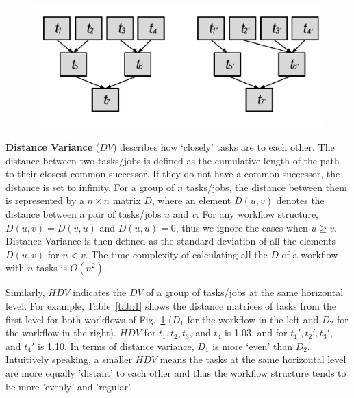 \documentclass[final]{IEEEtran}
\begin{document}
\begin{figure}[htb]
	\centering
	\includegraphics[width=0.85\linewidth]{figure/hifv.pdf}
	\label{fig:hifv}
	\vspace{-10pt}
\end{figure}

\textbf{Distance Variance} ($DV$) describes how `closely' tasks are to each other. The distance between two tasks/jobs is defined as the cumulative length of the path to their closest common successor. If they do not have a common successor, the distance is set to infinity. For a group of $n$ tasks/jobs, the distance between them is represented by a $n \times n$ matrix $D$, where an element $D(u,v)$ denotes the distance between a pair of tasks/jobs $u$ and $v$. For any workflow structure, $D(u,v)=D(v,u)$ and $D(u,u)=0$, thus we ignore the cases when $u \geq v$. Distance Variance is then defined as the standard deviation of all the elements $D(u,v)$ for $u<v$. The time complexity of calculating all the $D$ of a workflow with $n$ tasks is $O(n^2)$. 

Similarly, $HDV$ indicates the $DV$ of a group of tasks/jobs at the same horizontal level. For example, Table~\ref{tab:1} shows the distance matrices of tasks from the first level for both workflows of Fig.~\ref{fig:hifv} ($D_1$ for the workflow in the left and $D_2$ for the workflow in the right). $HDV$ for $t_1, t_2, t_3$, and $t_4$ is 1.03, and for $t_1', t_2', t_3'$, and $t_4'$ is 1.10. In terms of distance variance, $D_1$ is more `even' than $D_2$. Intuitively speaking, a smaller $HDV$ means the tasks at the same horizontal level are more equally 'distant' to each other and thus the workflow structure tends to be more 'evenly' and 'regular'. 
\end{document}
